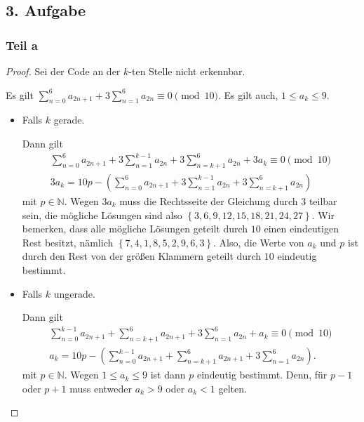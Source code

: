 \documentclass[a5paper]{article}
\theoremstyle{remark}
\begin{document}
\subsection{3. Aufgabe}
\subsubsection{Teil a}
\begin{proof}
  Sei der Code an der \(k\)-ten Stelle nicht erkennbar.

  Es gilt $\sum_{n=0}^6{a_{2n+1}}+3\sum_{n=1}^6{a_{2n}} \equiv 0
  \pmod{10}$.  Es gilt auch, \(1 \leq a_k \leq 9\).

  \begin{itemize}
  \item Falls \(k\) gerade.

    Dann gilt
\begin{align*}
  \sum_{n=0}^6{a_{2n+1}}+3\sum_{n=1}^{k-1}{a_{2n}}+3\sum_{n=k+1}^{6}{a_{2n}}+3a_k
  \equiv 0 \pmod{10}\\
  3a_k=10p-\left( \sum_{n=0}^6{a_{2n+1}}+3\sum_{n=1}^{k-1}{a_{2n}}+3\sum_{n=k+1}^{6}{a_{2n}} \right)
\end{align*}
mit \(p \in \mathbb{N}\).  Wegen \(3a_k\) muss die Rechtsseite der
Gleichung durch \(3\) teilbar sein, die mögliche Lösungen sind also
$\left\{ 3, 6, 9, 12, 15, 18, 21, 24, 27 \right\}$.  Wir bemerken,
dass alle mögliche Lösungen geteilt durch \(10\) einen eindeutigen Rest
besitzt, nämlich \(\left\{ 7, 4, 1, 8, 5, 2, 9, 6, 3 \right\}\).  Also,
die Werte von \(a_k\) und \(p\) ist durch den Rest von der größen Klammern
geteilt durch \(10\) eindeutig bestimmt.

  \item Falls \(k\) ungerade.

    Dann gilt
\begin{align*}
  \sum_{n=0}^{k-1}{a_{2n+1}}+\sum_{n=k+1}^6{a_{2n+1}}+3\sum_{n=1}^6{a_{2n}}+a_k
  \equiv 0  \pmod{10}\\
  a_k=10p-\left( \sum_{n=0}^{k-1}{a_{2n+1}}+\sum_{n=k+1}^6{a_{2n+1}}+3\sum_{n=1}^6{a_{2n}} \right).
\end{align*}
mit \(p \in \mathbb{N}\).  Wegen \(1 \leq a_k \leq 9\) ist dann \(p\)
eindeutig bestimmt.  Denn, für \(p-1\) oder \(p+1\) muss entweder $a_k >
9$ oder \(a_k<1\) gelten.
  \end{itemize}
\end{proof}
\end{document}
